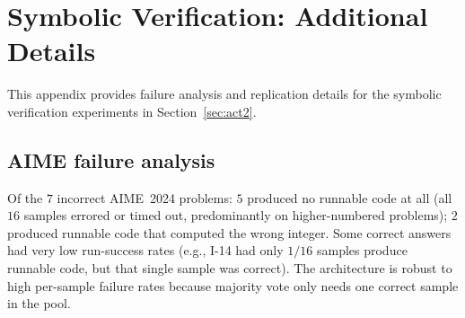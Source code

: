 \documentclass[11pt]{amsart}
\newcommand\1{{\mathds{1}}}
\theoremstyle{definition}
\theoremstyle{remark}
\numberwithin{equation}{section}
\begin{document}
\begin{table}[h]
\centering\small
\caption{Seven ARC-AGI architectures ranked by correctness ($30$ problems, $\texttt{qwen-22b}$ proposers throughout).}
\label{tab:arc}
\end{table}

\section{Symbolic Verification: Additional Details}\label{app:symver-details}

This appendix provides failure analysis and replication details for the symbolic verification experiments in Section~\ref{sec:act2}.

\subsection{AIME failure analysis}

Of the $7$ incorrect AIME~2024 problems: $5$ produced no runnable code at all (all $16$ samples errored or timed out, predominantly on higher-numbered problems); $2$ produced runnable code that computed the wrong integer.
Some correct answers had very low run-success rates (e.g., I-14 had only $1/16$ samples produce runnable code, but that single sample was correct).
The architecture is robust to high per-sample failure rates because majority vote only needs one correct sample in the pool.
\end{document}
